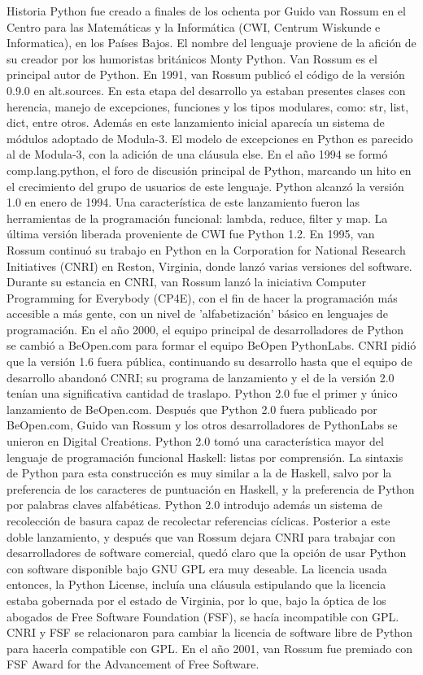 \documentclass[12pt]{article}
\begin{document}
Historia
Python fue creado a finales de los ochenta por Guido van Rossum en el Centro para las Matemáticas y la Informática (CWI, Centrum Wiskunde e Informatica), en los Países Bajos.
El nombre del lenguaje proviene de la afición de su creador por los humoristas británicos Monty Python.
Van Rossum es el principal autor de Python.
En 1991, van Rossum publicó el código de la versión 0.9.0 en alt.sources. En esta etapa del desarrollo ya estaban presentes clases con herencia, manejo de excepciones, funciones y los tipos modulares, como: str, list, dict, entre otros. Además en este lanzamiento inicial aparecía un sistema de módulos adoptado de Modula-3. El modelo de excepciones en Python es parecido al de Modula-3, con la adición de una cláusula else. En el año 1994 se formó comp.lang.python, el foro de discusión principal de Python, marcando un hito en el crecimiento del grupo de usuarios de este lenguaje.
Python alcanzó la versión 1.0 en enero de 1994. Una característica de este lanzamiento fueron las herramientas de la programación funcional: lambda, reduce, filter y map.
La última versión liberada proveniente de CWI fue Python 1.2. En 1995, van Rossum continuó su trabajo en Python en la Corporation for National Research Initiatives (CNRI) en Reston, Virginia, donde lanzó varias versiones del software.
Durante su estancia en CNRI, van Rossum lanzó la iniciativa Computer Programming for Everybody (CP4E), con el fin de hacer la programación más accesible a más gente, con un nivel de 'alfabetización' básico en lenguajes de programación.
En el año 2000, el equipo principal de desarrolladores de Python se cambió a BeOpen.com para formar el equipo BeOpen PythonLabs. CNRI pidió que la versión 1.6 fuera pública, continuando su desarrollo hasta que el equipo de desarrollo abandonó CNRI; su programa de lanzamiento y el de la versión 2.0 tenían una significativa cantidad de traslapo.​ Python 2.0 fue el primer y único lanzamiento de BeOpen.com. Después que Python 2.0 fuera publicado por BeOpen.com, Guido van Rossum y los otros desarrolladores de PythonLabs se unieron en Digital Creations.
Python 2.0 tomó una característica mayor del lenguaje de programación funcional Haskell: listas por comprensión. La sintaxis de Python para esta construcción es muy similar a la de Haskell, salvo por la preferencia de los caracteres de puntuación en Haskell, y la preferencia de Python por palabras claves alfabéticas. Python 2.0 introdujo además un sistema de recolección de basura capaz de recolectar referencias cíclicas.
Posterior a este doble lanzamiento, y después que van Rossum dejara CNRI para trabajar con desarrolladores de software comercial, quedó claro que la opción de usar Python con software disponible bajo GNU GPL era muy deseable. La licencia usada entonces, la Python License, incluía una cláusula estipulando que la licencia estaba gobernada por el estado de Virginia, por lo que, bajo la óptica de los abogados de Free Software Foundation (FSF), se hacía incompatible con GPL. CNRI y FSF se relacionaron para cambiar la licencia de software libre de Python para hacerla compatible con GPL. En el año 2001, van Rossum fue premiado con FSF Award for the Advancement of Free Software.
\end{document}
